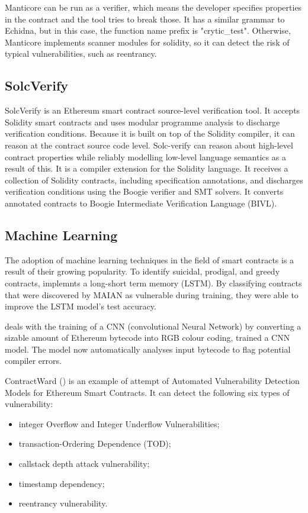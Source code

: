 \documentclass[a4paper,sigconf, language=french,
language=german, language=spanish, language=english]{acmart}
\begin{document}
Manticore can be run as a verifier, which means the developer specifies properties in the contract and the tool tries to break those. It has a similar grammar to Echidna, but in this case, the function name prefix is "crytic\_test". Otherwise, Manticore implements scanner modules for solidity, so it can detect the risk of typical vulnerabilities, such as reentrancy.

\subsection{SolcVerify} 
SolcVerify is an Ethereum smart contract source-level verification tool.
It accepts Solidity smart contracts and uses modular programme analysis to discharge verification conditions.
Because it is built on top of the Solidity compiler, it can reason at the contract source code level.
Solc-verify can reason about high-level contract properties while reliably modelling low-level language semantics as a result of this.
It is a compiler extension for the Solidity language.
It receives a collection of Solidity contracts, including specification annotations, and discharges verification conditions using the Boogie verifier and SMT solvers.
It converts annotated contracts to Boogie Intermediate Verification Language (BIVL).
\subsection{Machine Learning}
The adoption of machine learning techniques in the field of smart contracts is a result of their growing popularity. To identify suicidal, prodigal, and greedy contracts, \cite{MLAnalysis} implemnts a long-short term memory (LSTM).
By classifying contracts that were discovered by MAIAN as vulnerable during training, they were able to improve the LSTM model's test accuracy. 

\cite{CNNML} deals with the training of a CNN (convolutional Neural Network) by converting a sizable amount of Ethereum bytecode into RGB colour coding,  trained a CNN model. The model now automatically analyses input bytecode to flag potential compiler errors. 

ContractWard (\cite{MLtool}) is an example of attempt of Automated Vulnerability Detection Models for Ethereum Smart Contracts. It can detect the following six types of vulnerability: 
\begin{itemize}
    \item integer Overflow and Integer Underflow Vulnerabilities;
    \item transaction-Ordering Dependence (TOD);
    \item callstack depth attack vulnerability;
    \item timestamp dependency;
    \item reentrancy vulnerability.
\end{itemize}
\end{document}

